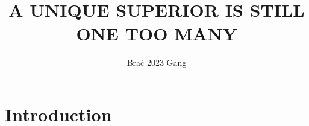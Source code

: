 \documentclass{patmorin}
\title{\MakeUppercase{A Unique Superior is Still One Too Many}}
\author{Bra\v{c} 2023 Gang}
\newcommand{\defin}[1]{\emph{\color{brightmaroon}#1}}
\newcommand{\rn}[1]{\chi_{\operatorname{#1-vr}}}
\newcommand{\trn}{\chi_{\mathrm{us}}}
\newcommand{\lrn}{\rn{\ell}}
\begin{document}
\maketitle

\begin{abstract}
\end{abstract}


%



\section{Introduction}
\end{document}
